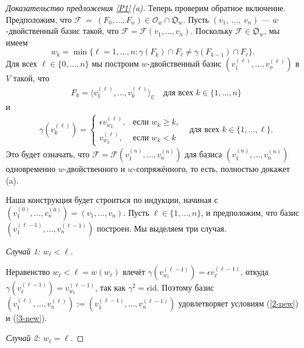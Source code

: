 \documentclass{amsart}
\theoremstyle{definition}
\begin{document}
\begin{proof}[Доказательство предложения \ref{P1}\,{\rm (a)}]
Теперь проверим обратное включение. Предположим, что
$\mathcal{F}\:=\:(F_0,\ldots,F_n)\in\mathcal{O}_w \cap \mathfrak{O}_w$.
Пусть $(v_1,\:\ldots,\:v_n)$ --- $w$-двойственный базис такой, что $ \mathcal{F} = \mathcal{F}(v_1,\ldots,v_n)$.
Поскольку $\mathcal{F}\in\mathfrak{O}_w$, мы имеем
\begin{equation}
\label{1-new}
w_k=\min\{\ell=1,\ldots,n:\gamma(F_k)\cap F_\ell\not=\gamma(F_{k-1})\cap F_\ell\}.
\end{equation}
Для всех $\ell\in\{0,\ldots,n\}$ мы построим  $w$-двойственный базис
$(v_1^{(\ell)},\ldots,v_n^{(\ell)})$ в $V$ такой, что
\begin{eqnarray}
\label{2-new}
& F_k=\langle v_1^{(\ell)},\ldots,v_k^{(\ell)}\rangle_\mathbb{C}
\quad\mbox{
для всех $k\in\{1,\ldots,n\}$}
\end{eqnarray}
и
\begin{eqnarray}
\label{3-new}
&
\gamma(v_k^{(\ell)})=\left\{\begin{array}{ll}
\epsilon v_{w_k}^{(\ell)}, & \mbox{если $w_k\geq k$,} \\
v_{w_k}^{(\ell)}, & \mbox{если $w_k<k$}
\end{array}\right.
\quad\mbox{
для всех $k\in\{1,\ldots,\ell\}$.}
\end{eqnarray}
Это будет означать, что
$\mathcal{F}=\mathcal{F}(v_1^{(n)},\ldots,v_n^{(n)})$ для базиса $(v_1^{(n)},\ldots,v_n^{(n)})$ одновременно $w$-двойственного и $w$-сопряжённого,
то есть, полностью докажет (a).

Наша конструкция будет строиться по индукции, начиная с $(v_1^{(0)},\ldots,v_n^{(0)})=(v_1,\ldots,v_n)$.
Пусть $\ell\in\{1,\ldots,n\}$, и предположим, что базис $(v_1^{(\ell-1)},\ldots,v_n^{(\ell-1)})$ построен.
Мы выделяем три случая.

\smallskip
\noindent
{\it Случай 1: $w_\ell<\ell$.}

Неравенство $w_\ell<\ell=w(w_\ell)$ влечёт $\gamma(v_{w_\ell}^{(\ell-1)})=\epsilon v_{\ell}^{(\ell-1)}$, откуда
$\gamma(v_{\ell}^{(\ell-1)})=v_{w_\ell}^{(\ell-1)}$, так как $\gamma^2=\epsilon\mathrm{id}$.
Поэтому базис $(v_1^{(\ell)},\ldots,v_n^{(\ell)}):=(v_1^{(\ell-1)},\ldots,v_n^{(\ell-1)})$ удовлетворяет условиям (\ref{2-new}) и (\ref{3-new}).

\smallskip
\noindent
{\it Случай 2: $w_\ell=\ell$.}


\end{proof}
\end{document}
